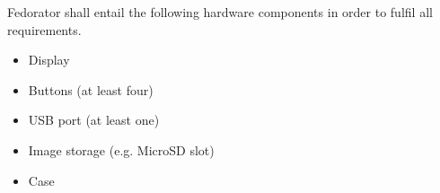         
        Fedorator shall entail the following hardware components in order to fulfil all requirements.
        \begin{itemize}
            \item Display
            \item Buttons (at least four)
            \item USB port (at least one)
            \item Image storage (e.g. MicroSD slot)
            \item Case
        \end{itemize}
        
        \blind[1]
